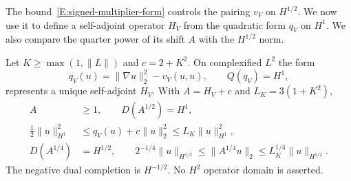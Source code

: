 The bound~\eqref{E:signed-multiplier-form} controls the pairing $v_V$ on
$H^{1/2}$. We now use it to define a self-adjoint operator $H_V$ from the
quadratic form $q_V$ on $H^1$. We also compare the quarter power of its shift
$A$ with the $H^{1/2}$ norm.

\begin{proposition}
  \label{P:signed-closed-form}
  Let $K \ge \max(1,\|L\|)$ and $c = 2+K^2$. On complexified $L^2$ the form
  \[
    q_V(u)=\|\nabla u\|_2^2-v_V(u,u),\qquad Q(q_V)=H^1,
  \]
  represents a unique self-adjoint $H_V$. With $A = H_V+c$ and $L_K = 3(1+K^2)$,
  \begin{align}
    A&\ge1,\qquad D(A^{1/2})=H^1,\label{E:signed-form-domain}\\
    \tfrac12\|u\|_{H^1}^2
    &\le q_V(u)+c\|u\|_2^2\le L_K\|u\|_{H^1}^2,\label{E:signed-form-bounds}\\
    D(A^{1/4})&=H^{1/2},\qquad
    2^{-1/4}\|u\|_{H^{1/2}}
    \le\|A^{1/4}u\|_2\le L_K^{1/4}\|u\|_{H^{1/2}}.
    \label{E:signed-quarter-phase}
  \end{align}
  The negative dual completion is $H^{-1/2}$. No $H^2$ operator domain is
  asserted.
\end{proposition}

